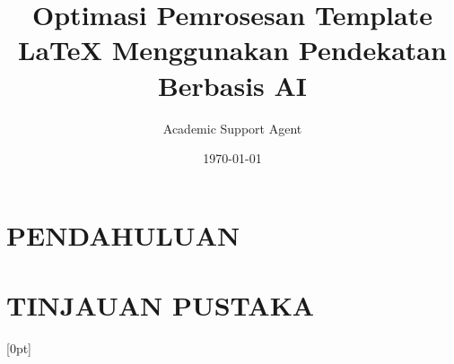 \documentclass{umdiss}
\title{Optimasi Pemrosesan Template LaTeX Menggunakan Pendekatan Berbasis AI}
\author{Academic Support Agent}
\date{\today}
\begin{document}
\maketitle

\begin{abstract}

\end{abstract}

\chapter{PENDAHULUAN}


\chapter{TINJAUAN PUSTAKA}



\usepackage{afterpage, amsfonts, amsmath, amssymb, amsxtra,tabularx, arydshln, boxedminipage, changepage,  comment, diagbox, epsfig, epstopdf, float, graphics, graphicx, lastpage, lscape, mathtools, mdwmath,nicefrac, multirow, pifont, psfig, url, xspace} %




\usepackage{cite} %


\usepackage{xspace}
\usepackage{subcaption}


\newcommand{\etal}{\textit{et al. \xspace}}
\newcommand{\ie}{i.e.,\xspace}
\newcommand{\eg}{e.g.,\xspace}
\newcommand{\nb}{n.b.,\xspace}



\captionsetup[table]{justification=centering}

\usepackage{dsfont}


\usepackage{mathtools}
\usepackage{bm}
\usepackage{esvect}


\usepackage{booktabs}
\usepackage{multicol}
\usepackage{multirow}
\usepackage{hhline}

\usepackage{lineno}

\usepackage{stackengine}


\usepackage[multiple,symbol]{footmisc}


\usepackage{titletoc} %
  [0pt]%
  {}%
  {\bfseries\MakeUppercase{\chaptername}\ \thecontentslabel\quad}%
  {\bfseries}%
  {\bfseries\hfill\contentspage}%
  
\end{document}
